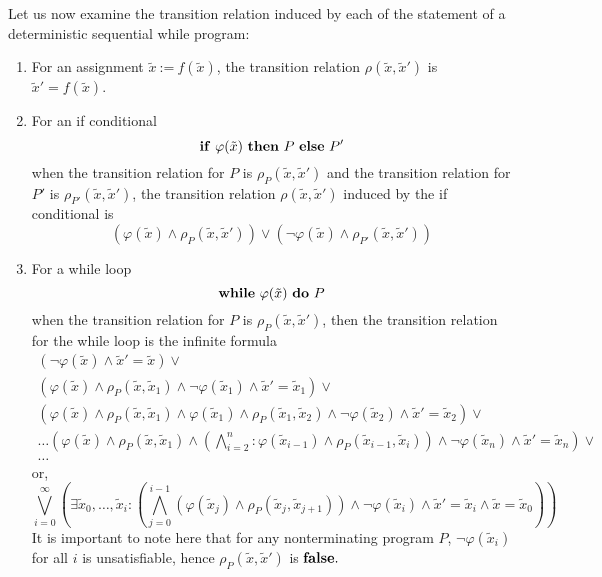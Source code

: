 \documentclass[times]{elsarticle}
\newcommand{\pif}{\mbox{\textbf{if}}}
\newcommand{\pthen}{\mbox{\textbf{then}}}
\newcommand{\pelse}{\mbox{\textbf{else}}}
\newcommand{\pwhile}{\mbox{\textbf{while}}}
\newcommand{\pdo}{\mbox{\textbf{do}}}
\newcommand{\passign}{\mbox{:=}}
\newcommand{\pfalse}{\mbox{\textbf{false}}}
\begin{document}
Let us now examine the transition relation induced by each of the
statement of a deterministic sequential while program:
\begin{enumerate}
\item For an assignment $\tilde{x} ~\passign~ f(\tilde{x})$, the transition relation $\rho(\tilde{x},\tilde{x}')$ is $\tilde{x}'=f(\tilde{x})$.
\item For an if conditional
\[
\pif ~ \varphi(\tilde{x}) ~\pthen ~P~ \pelse~ P'
\]
when the transition relation for $P$ is $\rho_P(\tilde{x},\tilde{x}')$ and the
transition relation for $P'$ is $\rho_{P'}(\tilde{x},\tilde{x}')$, the transition relation
$\rho(\tilde{x},\tilde{x}')$ induced by the if conditional is
\[
(\varphi(\tilde{x}) \wedge \rho_{P}(\tilde{x},\tilde{x}')) \vee (\neg \varphi(\tilde{x}) \wedge \rho_{P'}(\tilde{x},\tilde{x}'))
\]
\item For a while loop
\[
\pwhile ~ \varphi(\tilde{x})~ \pdo ~P
\]
when the transition relation for $P$ is $\rho_P(\tilde{x},\tilde{x}')$, then the
transition relation for the while loop is the infinite formula
\[
\begin{array}{c}
(\neg \varphi(\tilde{x}) \wedge \tilde{x}'=\tilde{x}) \vee\\
(\varphi(\tilde{x}) \wedge \rho_P(\tilde{x},\tilde{x}_1) \wedge \neg \varphi(\tilde{x}_1) \wedge \tilde{x}'=\tilde{x}_1) \vee\\
(\varphi(\tilde{x}) \wedge \rho_P(\tilde{x},\tilde{x}_1) \wedge \varphi(\tilde{x}_1) \wedge \rho_P(\tilde{x}_1,\tilde{x}_2) \wedge\neg
\varphi(\tilde{x}_2)\wedge \tilde{x}'=\tilde{x}_2) \vee\\
\ldots
(\varphi(\tilde{x}) \wedge \rho_P(\tilde{x},\tilde{x}_1) \wedge (\bigwedge_{i=2}^n : \varphi(\tilde{x}_{i-1}) \wedge
\rho_P(\tilde{x}_{i-1},\tilde{x}_i)) \wedge \neg \varphi(\tilde{x}_n) \wedge \tilde{x}'=\tilde{x}_n) \vee\\
\ldots
\end{array}
\]
or,
\[
\bigvee_{i=0}^{\infty} (\exists \tilde{x}_0,\ldots ,\tilde{x}_i :
(\bigwedge_{j=0}^{i-1} (\varphi(\tilde{x}_j) \wedge \rho_P(\tilde{x}_j,\tilde{x}_{j+1})) \wedge \neg \varphi(\tilde{x}_i) \wedge \tilde{x}'=\tilde{x}_i \wedge \tilde{x}=\tilde{x}_0))
\]
It is important to note here that for any nonterminating program $P$, $\neg
\varphi(\tilde{x}_i)$ for all $i$ is unsatisfiable, hence $\rho_P(\tilde{x},\tilde{x}')$ is $\pfalse.$
\end{enumerate}
\end{document}
